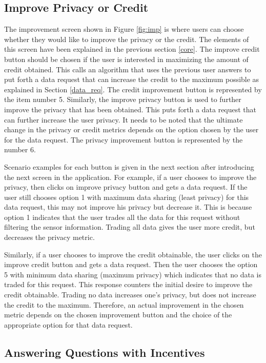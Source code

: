 \subsection{Improve Privacy or Credit}

The improvement screen shown in Figure \ref{fig:imp} is where users can choose whether they would like to improve the privacy or the credit. The elements of this screen have been explained in the previous section \ref{core}.
The improve credit button
should be chosen if the user is interested in maximizing the amount of credit obtained. This calls an algorithm that uses the previous user answers to
put forth a data request that can increase the credit to the maximum possible as explained in Section \ref{data_req}. The credit improvement button is represented by the item number 5. Similarly, the improve privacy button is used to further improve the privacy that has been obtained. This puts forth a data request that can further increase the user privacy. It needs to be noted that the ultimate change in the privacy or credit metrics depends on the option chosen by the user for the data request. The privacy improvement button is represented by the number 6.

Scenario examples for each button is given in the next section after introducing the next screen in the application. For example, if a user chooses to improve the privacy, then clicks on improve privacy button and gets a data request. If the user still chooses option 1 with maximum data sharing (least privacy) for this data request, this may not improve his privacy but decrease it. This is because option 1 indicates that the user trades all the data for this request without filtering the sensor information. Trading all data gives the user more credit, but decreases the privacy metric.

Similarly, if a user chooses to improve the credit obtainable, the user clicks on the improve credit button and gets a data request. Then the user chooses the option 5 with minimum data sharing (maximum privacy) which indicates that no data is traded for this request. This response counters the initial desire to improve the credit obtainable. Trading no data increases one's privacy, but does not increase the credit to the maximum. Therefore, an actual improvement in the chosen metric depends on the chosen improvement button and the choice of the appropriate option for that data request.

\subsection{Answering Questions with Incentives}

